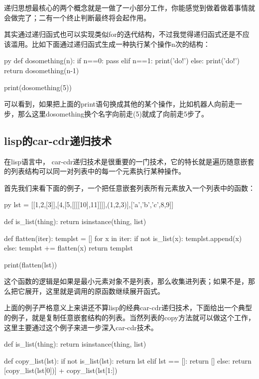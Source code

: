 \documentclass[12pt,oneside]{book}
\begin{document}
\begin{common-format}
递归思想最核心的两个概念就是一做了一小部分工作，你能感觉到做着做着事情就会做完了；二有一个终止判断最终将会起作用。

其实通过递归函式也可以实现类似for的迭代结构，不过我觉得递归函式还是不应该滥用。比如下面通过递归函式生成一种执行某个操作n次的结构：

\begin{xverbatim}[129]{py}
def dosomething(n):
    if n==0:
        pass
    elif n==1:
        print('do!')
    else:
        print('do!')
        return dosomething(n-1)

print(dosomething(5))
\end{xverbatim}
可以看到，如果把上面的print语句换成其他的某个操作，比如机器人向前走一步，那么这里dosomething换个名字向前走(5)就成了向前走5步了。

\subsection{lisp的car-cdr递归技术}
在lisp语言中， car-cdr递归技术是很重要的一门技术，它的特长就是遍历随意嵌套的列表结构可以同一对列表中的每一个元素执行某种操作。

首先我们来看下面的例子，一个把任意嵌套列表所有元素放入一个列表中的函数：
\begin{xverbatim}[129]{py}
lst = [[1,2,[3]],[4,[5,[[[[10],11]]]],(1,2,3)],[{'a','b','c'},8,9]]

def is_list(thing):
    return isinstance(thing, list)

def flatten(iter):
    templst = []
    for x in iter:
        if not is_list(x):
            templst.append(x)
        else:
            templst += flatten(x)
    return templst

print(flatten(lst))
\end{xverbatim}

这个函数的逻辑是如果是最小元素对象不是列表，那么收集进列表；如果不是，那么把它展开，这里就是调用的原函数继续展开函式。

上面的例子严格意义上来讲还不算lisp的经典car-cdr递归技术，下面给出一个典型的例子，就是复制任意嵌套结构的列表。当然列表的copy方法就可以做这个工作，这里主要通过这个例子来进一步深入car-cdr技术。

\begin{tcbpython}[]
def is_list(thing):
    return isinstance(thing, list)

def copy_list(lst):
    if  not  is_list(lst):
        return lst
    elif lst == []:
        return []
    else:
        return [copy_list(lst[0])] + copy_list(lst[1:])


\end{tcbpython}
\end{common-format}
\end{document}

